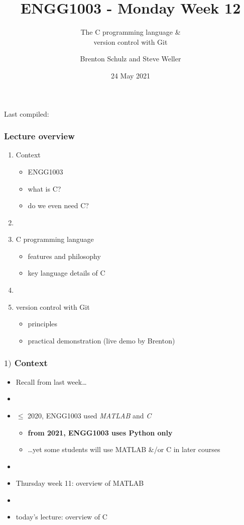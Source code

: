 \documentclass[english,14pt]{beamer}
\title{ENGG1003 - Monday Week 12}
\subtitle{The C programming language \& \\ version control with Git}
\author{Brenton Schulz and Steve Weller}
\institute{University of Newcastle}
\date{24 May 2021}
\newcommand\red[1]{{\color{red} #1}}
\begin{document}
\begin{flushleft}
{\scriptsize Last compiled:~\DTMnow}
\vspace*{-5mm}
\end{flushleft}
\framebreak


\begin{frame}[fragile]

\frametitle{Lecture overview}
\begin{enumerate}
	\item Context
	\begin{itemize}
		\item ENGG1003
		\item what is C?
		\item do we even need C?
	\end{itemize}
	\item[]
		\item C programming language
	\begin{itemize}
		\item features and philosophy
		\item key language details of C
	\end{itemize}
	\item[]
	\item version control with Git
		\begin{itemize}
			\item principles
			\item practical demonstration (live demo by Brenton)
		\end{itemize}		
\end{enumerate}

\end{frame}



\begin{frame}[fragile]

\frametitle{$1)$ Context}

\begin{itemize}
	\item Recall from last week\ldots
	\item[]
	\item $\leq$ 2020, ENGG1003 used \red{\emph{MATLAB}} and \red{\emph{C}}
	\begin{itemize}
		\item \textbf{from 2021, ENGG1003 uses Python only}
		\item \ldots yet some students will use MATLAB \&/or C in later courses
	\end{itemize}
	\item[]
	\item Thursday week 11: overview of MATLAB
	\item[]
	\item today's lecture: overview of C
\end{itemize}

\end{frame}
\end{document}
